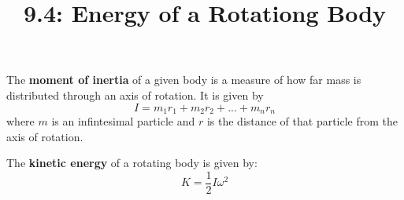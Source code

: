 \documentclass{article}
\title{9.4: Energy of a Rotationg Body}
\begin{document}
\maketitle
\begin{definition}
The \textbf{moment of inertia} of a given body is a measure of how far mass is distributed through an axis of rotation. It is given by $$I = m_1r_1 + m_2r_2 + ... + m_nr_n$$where $m$ is an infintesimal particle and $r$ is the distance of that particle from the axis of rotation. 
\end{definition}

\begin{definition}
The \textbf{kinetic energy} of a rotating body is given by: $$K = \frac{1}{2}I\omega^2$$
\end{definition}
\end{document}
